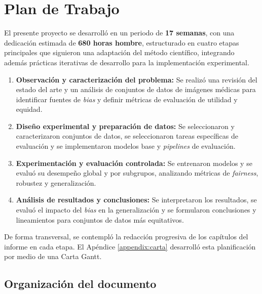 \section{Plan de Trabajo}

El presente proyecto se desarrolló en un periodo de \textbf{17 semanas}, con una dedicación estimada de \textbf{680 horas hombre}, estructurado en cuatro etapas principales que siguieron una adaptación del método científico, integrando además prácticas iterativas de desarrollo para la implementación experimental.

\begin{enumerate}
\item \textbf{Observación y caracterización del problema:} Se realizó una revisión del estado del arte y un análisis de conjuntos de datos de imágenes médicas para identificar fuentes de \textit{bias} y definir métricas de evaluación de utilidad y equidad.
\item \textbf{Diseño experimental y preparación de datos:} Se seleccionaron y caracterizaron conjuntos de datos, se seleccionaron tareas específicas de evaluación y se implementaron modelos base y \textit{pipelines} de evaluación.
\item \textbf{Experimentación y evaluación controlada:} Se entrenaron modelos y se evaluó su desempeño global y por subgrupos, analizando métricas de \textit{fairness}, robustez y generalización.
\item \textbf{Análisis de resultados y conclusiones:} Se interpretaron los resultados, se evaluó el impacto del \textit{bias} en la generalización y se formularon conclusiones y lineamientos para conjuntos de datos más equitativos.
\end{enumerate}

De forma transversal, se contempló la redacción progresiva de los capítulos del informe en cada etapa. El Apéndice \ref{appendix:carta} desarrolló esta planificación por medio de una Carta Gantt.

\subsection{Organización del documento}

